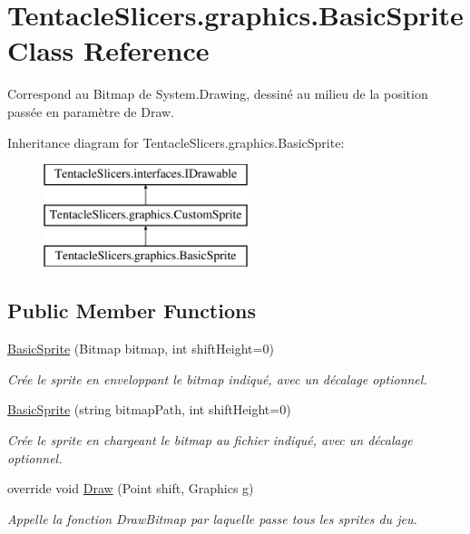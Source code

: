 \hypertarget{class_tentacle_slicers_1_1graphics_1_1_basic_sprite}{}\section{Tentacle\+Slicers.\+graphics.\+Basic\+Sprite Class Reference}
\label{class_tentacle_slicers_1_1graphics_1_1_basic_sprite}


Correspond au Bitmap de System.\+Drawing, dessiné au milieu de la position passée en paramètre de Draw.  


Inheritance diagram for Tentacle\+Slicers.\+graphics.\+Basic\+Sprite\+:\begin{figure}[H]
\begin{center}
\leavevmode
\includegraphics[height=3.000000cm]{class_tentacle_slicers_1_1graphics_1_1_basic_sprite}
\end{center}
\end{figure}
\subsection*{Public Member Functions}
\begin{DoxyCompactItemize}
\item 
\hyperlink{class_tentacle_slicers_1_1graphics_1_1_basic_sprite_a7e920b54d36041db7a3d7fdcc4f37f0b}{Basic\+Sprite} (Bitmap bitmap, int shift\+Height=0)
\begin{DoxyCompactList}\small\item\em Crée le sprite en enveloppant le bitmap indiqué, avec un décalage optionnel. \end{DoxyCompactList}\item 
\hyperlink{class_tentacle_slicers_1_1graphics_1_1_basic_sprite_a6f5c14f727a65f3a7af60541d001a34f}{Basic\+Sprite} (string bitmap\+Path, int shift\+Height=0)
\begin{DoxyCompactList}\small\item\em Crée le sprite en chargeant le bitmap au fichier indiqué, avec un décalage optionnel. \end{DoxyCompactList}\item 
override void \hyperlink{class_tentacle_slicers_1_1graphics_1_1_basic_sprite_aca1918e67a22a98d4953d74f4e90a2f7}{Draw} (Point shift, Graphics g)
\begin{DoxyCompactList}\small\item\em Appelle la fonction Draw\+Bitmap par laquelle passe tous les sprites du jeu. \end{DoxyCompactList}\end{DoxyCompactItemize}
